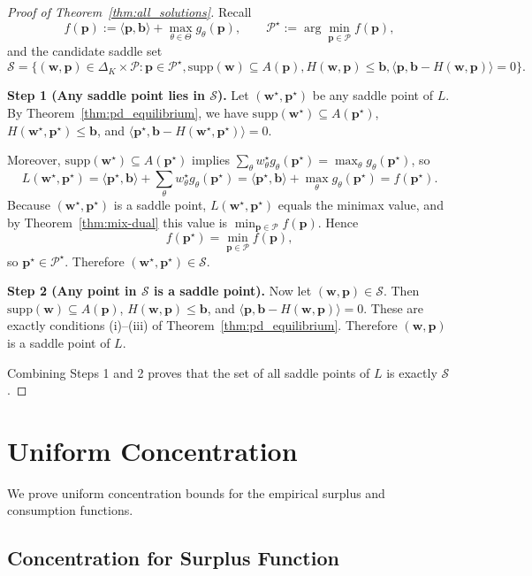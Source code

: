 \documentclass[11pt]{article}
\newcommand{\bb}{\mathbf{b}}
\newcommand{\bp}{\mathbf{p}}
\newcommand{\bw}{\mathbf{w}}
\newcommand{\cP}{\mathcal{P}}
\newcommand{\cS}{\mathcal{S}}
\begin{document}
\begin{proof}[Proof of Theorem~\ref{thm:all_solutions}]
Recall
\[
f(\bp) := \langle \bp, \bb \rangle + \max_{\theta \in \Theta} g_\theta(\bp), \qquad \cP^\star := \arg\min_{\bp \in \cP} f(\bp),
\]
and the candidate saddle set
\[
\cS = \Big\{(\bw, \bp) \in \Delta_K \times \cP : \bp \in \cP^\star, \mathrm{supp}(\bw) \subseteq A(\bp), H(\bw, \bp) \le \bb, \langle \bp, \bb - H(\bw, \bp) \rangle = 0\Big\}.
\]

\textbf{Step 1 (Any saddle point lies in $\cS$).}
Let $(\bw^\star, \bp^\star)$ be any saddle point of $L$.
By Theorem~\ref{thm:pd_equilibrium}, we have $\mathrm{supp}(\bw^\star) \subseteq A(\bp^\star)$, $H(\bw^\star, \bp^\star) \le \bb$, and $\langle \bp^\star, \bb - H(\bw^\star, \bp^\star) \rangle = 0$.

Moreover, $\mathrm{supp}(\bw^\star) \subseteq A(\bp^\star)$ implies $\sum_\theta w_\theta^\star g_\theta(\bp^\star) = \max_\theta g_\theta(\bp^\star)$, so
\[
L(\bw^\star, \bp^\star) = \langle \bp^\star, \bb \rangle + \sum_\theta w_\theta^\star g_\theta(\bp^\star) = \langle \bp^\star, \bb \rangle + \max_\theta g_\theta(\bp^\star) = f(\bp^\star).
\]
Because $(\bw^\star, \bp^\star)$ is a saddle point, $L(\bw^\star, \bp^\star)$ equals the minimax value, and by Theorem~\ref{thm:mix-dual} this value is $\min_{\bp \in \cP} f(\bp)$. Hence
\[
f(\bp^\star) = \min_{\bp \in \cP} f(\bp),
\]
so $\bp^\star \in \cP^\star$. Therefore $(\bw^\star, \bp^\star) \in \cS$.

\textbf{Step 2 (Any point in $\cS$ is a saddle point).}
Now let $(\bw, \bp) \in \cS$. Then $\mathrm{supp}(\bw) \subseteq A(\bp)$, $H(\bw, \bp) \le \bb$, and $\langle \bp, \bb - H(\bw, \bp) \rangle = 0$. These are exactly conditions (i)--(iii) of Theorem~\ref{thm:pd_equilibrium}. Therefore $(\bw, \bp)$ is a saddle point of $L$.

Combining Steps 1 and 2 proves that the set of all saddle points of $L$ is exactly $\cS$.
\end{proof}

\section{Uniform Concentration}
\label{app:concentration}

We prove uniform concentration bounds for the empirical surplus and consumption functions.

\subsection{Concentration for Surplus Function}
\end{document}
